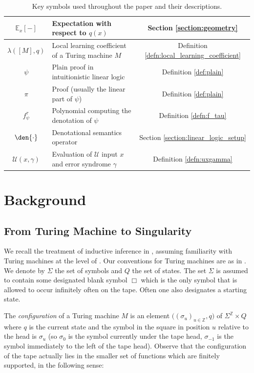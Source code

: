 \documentclass[english,letter paper,12pt,reqno]{article}
\theoremstyle{definition}
\begin{document}
\begin{table}[hptb]
\begin{tabular}{|c|p{9cm}|c|}
\hline
$\mathbb{E}_x[-]$ & Expectation with respect to $q(x)$ & Section \ref{section:geometry} \\
\hline
$\lambda([M],q)$ & Local learning coefficient of a Turing machine $M$ & Definition \ref{defn:local_learning_coefficient} \\
\hline
$\psi$ & Plain proof in intuitionistic linear logic & Definition \ref{def:plain} \\
\hline
$\pi$ & Proof (usually the linear part of $\psi$) & Definition \ref{def:plain} \\
\hline
$f^\tau_\psi$ & Polynomial computing the denotation of $\psi$ & Definition \ref{defn:f_tau} \\
\hline
$\den{\cdot}$ & Denotational semantics operator & Section \ref{section:linear_logic_setup} \\
\hline
$\mathcal{U}(x,\gamma)$ & Evaluation of $\mathcal{U}$ input $x$ and error syndrome $\gamma$ & Definition \ref{defn:uxgamma} \\
\hline
\end{tabular}
\caption{Key symbols used throughout the paper and their descriptions.}
\label{table:symbols}
\end{table}

\section{Background}\label{section:background}

\subsection{From Turing Machine to Singularity}\label{section:background_iid}

We recall the treatment of inductive inference in \cite{clift2018derivatives, clift2021geometry}, assuming familiarity with Turing machines at the level of \cite{arora2009computational}. Our conventions for Turing machines are as in \cite[\S 6.1]{clift2018derivatives}. We denote by $\Sigma$ the set of symbols and $Q$ the set of states. The set $\Sigma$ is assumed to contain some designated blank symbol $\Box$ which is the only symbol that is allowed to occur infinitely often on the tape. Often one also designates a starting state.

The \emph{configuration} of a Turing machine $M$ is an element $\big( (\sigma_u)_{u \in \mathbb{Z}}, q )$ of $\Sigma^{\mathbb{Z}} \times Q$ where $q$ is the current state and the symbol in the square in position $u$ relative to the head is $\sigma_u$ (so $\sigma_0$ is the symbol currently under the tape head, $\sigma_{-1}$ is the symbol immediately to the left of the tape head). Observe that the configuration of the tape actually lies in the smaller set of functions which are finitely supported, in the following sense:
\end{document}
